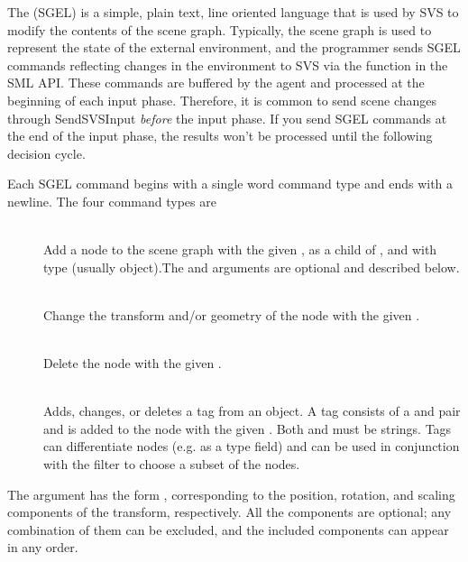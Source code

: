 The  (SGEL) is a simple, plain text, line oriented language that is used by SVS to modify the contents of the scene graph.
Typically, the scene graph is used to represent the state of the external environment, and the programmer sends SGEL commands reflecting changes in the environment to SVS via the  function in the SML API.
These commands are buffered by the agent and processed at the beginning of each input phase.
Therefore, it is common to send scene changes through SendSVSInput \emph{before} the input phase.
If you send SGEL commands at the end of the input phase,
the results won't be processed until the following decision cycle.

Each SGEL command begins with a single word command type and ends with a newline.
The four command types are

\vspace{-12pt}
\begin{description}
	\item[] \hfill \\
		Add a node to the scene graph with the given , as a child of , and with type  (usually object).The  and  arguments are optional and described below.

	\item[] \hfill \\
		Change the transform and/or geometry of the node with the given .

	\item[] \hfill \\
		Delete the node with the given .

	\item[] \hfill \\
	  Adds, changes, or deletes a tag from an object. A tag consists of a  and  pair and is added to the node with the given . Both  and  must be strings. Tags can differentiate nodes (e.g. as a type field) and can be used in conjunction with the  filter to choose a subset of the nodes.
\end{description}
\vspace{-6pt}

The  argument has the form \soar{[p X Y Z] [r X Y Z] [s X Y Z]}, corresponding to the position, rotation, and scaling components of the transform, respectively.
All the components are optional; any combination of them can be excluded, and the included components can appear in any order.

